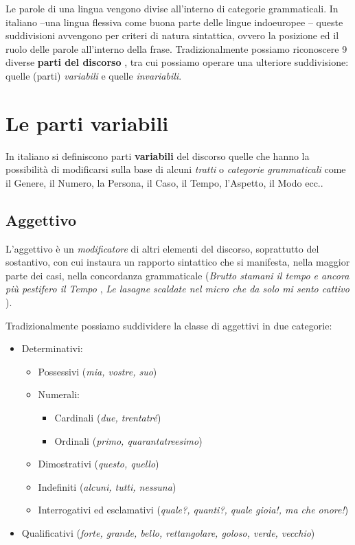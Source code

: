 \documentclass[a4paper,twoside,11pt,chapterprefix=false,bibliography=totocnumbered,listof=flat]{scrbook}
\providecommand{\tightlist}{%
  \setlength{\itemsep}{0pt}\setlength{\parskip}{0pt}}
\begin{document}
Le parole di una lingua vengono divise all'interno di categorie grammaticali. In italiano --una lingua flessiva come buona parte delle lingue indoeuropee \citep{graffiScalise2009}-- queste suddivisioni avvengono per criteri di natura sintattica, ovvero la posizione ed il ruolo delle parole all'interno della frase. Tradizionalmente possiamo riconoscere 9 diverse \textbf{parti del discorso} \citep{salvi2013}, tra cui possiamo operare una ulteriore suddivisione: quelle (parti) \emph{variabili} e quelle \emph{invariabili}.

\hypertarget{le-parti-variabili}{%
\section{Le parti variabili}\label{le-parti-variabili}}

In italiano si definiscono parti \textbf{variabili} del discorso quelle che hanno la possibilità di modificarsi sulla base di alcuni \emph{tratti} o \emph{categorie grammaticali} \citep[ Cap.9]{simone1995} come il Genere, il Numero, la Persona, il Caso, il Tempo, l'Aspetto, il Modo ecc..

\hypertarget{aggettivo}{%
\subsection{Aggettivo}\label{aggettivo}}

L'aggettivo è un \emph{modificatore} di altri elementi del discorso, soprattutto del sostantivo, con cui instaura un rapporto sintattico che si manifesta, nella maggior parte dei casi, nella concordanza grammaticale (\emph{Brutto stamani il tempo e ancora più pestifero il Tempo} \citep{montale-satura}, \emph{Le lasagne scaldate nel micro che da solo mi sento cattivo} \citep{fibra2017}).

Tradizionalmente possiamo suddividere la classe di aggettivi in due categorie:

\begin{itemize}
\tightlist
\item
  Determinativi:

  \begin{itemize}
  \tightlist
  \item
    Possessivi (\emph{mia, vostre, suo})
  \item
    Numerali:

    \begin{itemize}
    \tightlist
    \item
      Cardinali (\emph{due, trentatré})
    \item
      Ordinali (\emph{primo, quarantatreesimo})
    \end{itemize}
  \item
    Dimostrativi (\emph{questo, quello})
  \item
    Indefiniti (\emph{alcuni, tutti, nessuna})
  \item
    Interrogativi ed esclamativi (\emph{quale?, quanti?, quale gioia!, ma che onore!})
  \end{itemize}
\item
  Qualificativi (\emph{forte, grande, bello, rettangolare, goloso, verde, vecchio})
\end{itemize}
\end{document}
